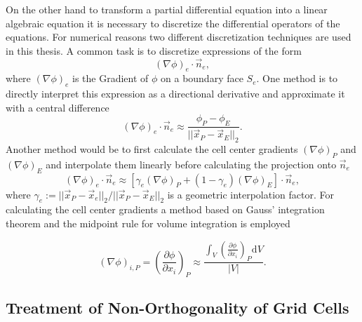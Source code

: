 On the other hand to transform a partial differential equation into a linear algebraic equation it is necessary to discretize the differential operators of the equations. For numerical reasons two different discretization techniques are used in this thesis. A common task is to discretize expressions of the form
\begin{displaymath}
  \left(\nabla \phi\right)_e \cdot \vec{n}_e,
\end{displaymath}
where \(\left(\nabla \phi\right)_e\) is the Gradient of \(\phi\) on a boundary face \(S_e\). One method is to directly interpret this expression as a directional derivative and approximate it with a central difference
\begin{equation}
  \label{eq:cds}
  \left(\nabla \phi\right)_e \cdot \vec{n}_e \approx \frac{\phi_P - \phi_E}{|| \vec{x}_P - \vec{x}_E ||_2}.
\end{equation}
Another method would be to first calculate the cell center gradients \(\left(\nabla \phi \right)_P\) and \(\left(\nabla \phi \right)_E\) and interpolate them linearly before calculating the projection onto \(\vec{n}_e\)
\begin{equation}
  \label{eq:interpolgrad}
  \left(\nabla \phi\right)_e \cdot \vec{n}_e 
  \approx 
  \left[\gamma_e \left(\nabla \phi \right)_P + (1-\gamma_e) \left(\nabla \phi \right)_E \right] \cdot \vec{n}_e,
\end{equation}
where \( \gamma_e := {||\vec{x}_P - \vec{x}_e||_2}/{||\vec{x}_P - \vec{x}_E||_2}\) is a geometric interpolation factor. For calculating the cell center gradients a method based on Gauss' integration theorem and the midpoint rule for volume integration is employed

\begin{equation}
  \label{eq:gaussgrad}
  \left( \nabla \phi \right)_{i,P}
  =
  \left( \frac{\partial \phi}{\partial x_i}\right)_P
  \approx
  \frac{\int_V\left(\frac{\partial \phi}{\partial x_i}\right)_P\mathrm{d}V}{|V|}.
\end{equation}

\subsection{Treatment of Non-Orthogonality of Grid Cells}
\label{sec:nonorth}

